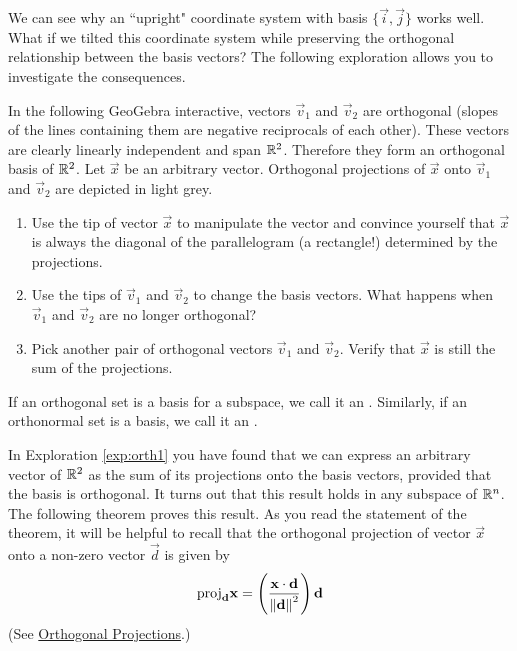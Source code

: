 \documentclass{ximera}
\begin{document}
We can see why an ``upright" coordinate system with basis $\{\vec{i},\vec{j}\}$ works well.  What if we tilted this coordinate system while preserving the orthogonal relationship between the basis vectors?  The following exploration allows you to investigate the consequences.

\begin{exploration}\label{exp:orth1}
    In the following GeoGebra interactive, vectors $\vec{v}_1$ and $\vec{v}_2$ are orthogonal (slopes of the lines containing them are negative reciprocals of each other).  These vectors are clearly linearly independent and span $\mathbb{R}^2$.  Therefore they form an orthogonal basis of $\mathbb{R}^2$.  Let $\vec{x}$ be an arbitrary vector.  Orthogonal projections of $\vec{x}$ onto $\vec{v}_1$ and $\vec{v}_2$ are depicted in light grey.
    \begin{enumerate}
        \item Use the tip of vector $\vec{x}$ to manipulate the vector and convince yourself that $\vec{x}$ is always the diagonal of the parallelogram (a rectangle!) determined by the projections.
        \item Use the tips of $\vec{v}_1$ and $\vec{v}_2$ to change the basis vectors.  What happens when $\vec{v}_1$ and $\vec{v}_2$ are no longer orthogonal?
        \item Pick another pair of orthogonal vectors $\vec{v}_1$ and $\vec{v}_2$.  Verify that $\vec{x}$ is still the sum of the projections.
    \end{enumerate}

    \begin{center}
\end{center}
\end{exploration}


If an orthogonal set is a basis for a subspace, we call it an
. Similarly, if an orthonormal set is a basis, we call it an .

In Exploration \ref{exp:orth1} you have found that we can express an arbitrary vector of $\mathbb{R}^2$ as the sum of its projections onto the basis vectors, provided that the basis is orthogonal. It turns out that this result holds in any subspace of $\mathbb{R}^n$. The following theorem proves this result.  As you read the statement of the theorem, it will be helpful to recall that the orthogonal projection of vector $\vec{x}$ onto a non-zero vector $\vec{d}$ is given by
\begin{equation}\label{eq:orthProj}
\mbox{proj}_{\mathbf{d}}\mathbf{x}=\left(\frac{\mathbf{x}\cdot\mathbf{d}}{\left\lVert\mathbf{d}\right\rVert^2}\right)\mathbf{d}
\end{equation}
(See \href{https://ximera.osu.edu/oerlinalg/LinearAlgebra/VEC-0070/main}{Orthogonal Projections}.)
\end{document}
